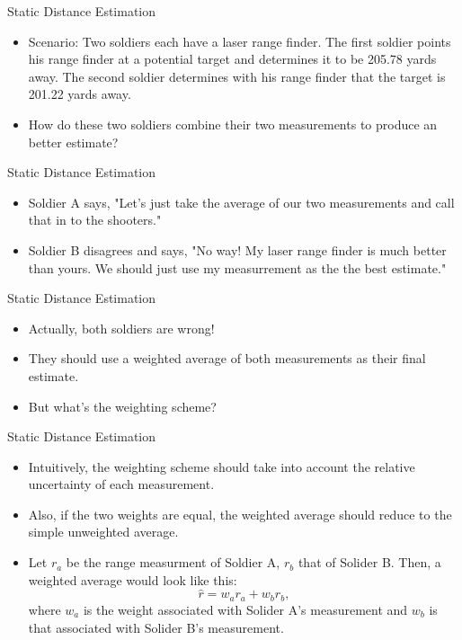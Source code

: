 \begin{frame}
Static Distance Estimation
\begin{itemize}
  \item Scenario:  Two soldiers each have a laser range finder.  The first soldier points his 
range finder at a potential target and determines it to be 205.78 yards away.  The second soldier 
determines with his range finder that the target is 201.22 yards away.
  \item How do these two soldiers combine their two measurements to 
produce an better estimate?
\end{itemize} 
\end{frame}

\begin{frame}
Static Distance Estimation
\begin{itemize}
  \item Soldier A says, "Let's just take the average of our two
measurements and call that in to the shooters."
  \item Soldier B disagrees and says, "No way!  My laser range finder
is much better than yours.  We should just use my measurrement as the 
the best estimate."
\end{itemize} 
\end{frame}


\begin{frame}
Static Distance Estimation
\begin{itemize}
  \item Actually, both soldiers are wrong!
  \item They should use a weighted average of both measurements as their final estimate.
  \item But what's the weighting scheme?
\end{itemize} 
\end{frame}

\begin{frame}
Static Distance Estimation
\begin{itemize}
  \item Intuitively, the weighting scheme should take into account the relative uncertainty of each measurement.
  \item Also, if the two weights are equal, the weighted average should reduce to the simple unweighted average.
  \item Let $r_a$ be the range measurment of Soldier A, $r_b$ that of Solider  B.  Then, a weighted average would look like this:
\[\hat{r}=w_a r_a+w_b r_b,\]
where $w_a$ is the weight associated with Solider A's measurement and $w_b$ is that associated with Solider B's measurement.
\end{itemize} 
\end{frame}


